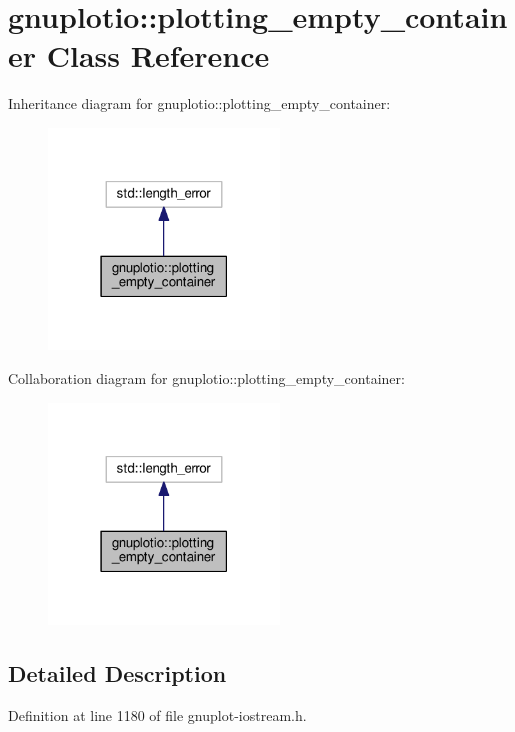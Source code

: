 \hypertarget{classgnuplotio_1_1plotting__empty__container}{}\section{gnuplotio\+:\+:plotting\+\_\+empty\+\_\+container Class Reference}
\label{classgnuplotio_1_1plotting__empty__container}


Inheritance diagram for gnuplotio\+:\+:plotting\+\_\+empty\+\_\+container\+:
\nopagebreak
\begin{figure}[H]
\begin{center}
\leavevmode
\includegraphics[width=174pt]{classgnuplotio_1_1plotting__empty__container__inherit__graph}
\end{center}
\end{figure}


Collaboration diagram for gnuplotio\+:\+:plotting\+\_\+empty\+\_\+container\+:
\nopagebreak
\begin{figure}[H]
\begin{center}
\leavevmode
\includegraphics[width=174pt]{classgnuplotio_1_1plotting__empty__container__coll__graph}
\end{center}
\end{figure}


\subsection{Detailed Description}


Definition at line 1180 of file gnuplot-\/iostream.\+h.

